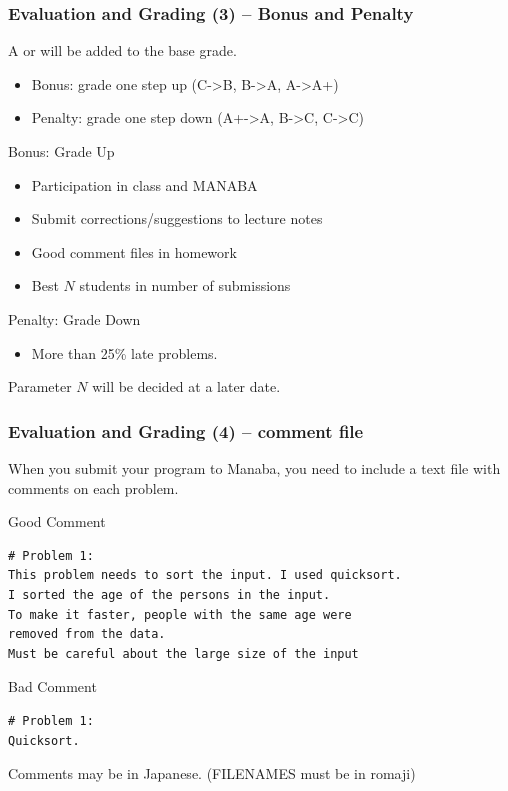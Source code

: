 \documentclass{beamer}
\begin{document}
\begin{frame}
  \frametitle{Evaluation and Grading (3) -- Bonus and Penalty}
  
  {\small
  A  or  will be added to the base grade.
  \begin{itemize}
    \item Bonus: grade one step up (C->B, B->A, A->A+)
    \item Penalty: grade one step down (A+->A, B->C, \alert{C->C})
  \end{itemize}
  }

  \medskip
  \begin{exampleblock}{Bonus: Grade Up}
    \begin{itemize}
    \item Participation in class and MANABA
    \item Submit corrections/suggestions to lecture notes
    \item Good comment files in homework
    \item Best $N$ students in number of submissions
    \end{itemize}
  \end{exampleblock}
  \begin{alertblock}{Penalty: Grade Down}
    \begin{itemize}
    \item More than 25\% late problems.
    \end{itemize}
  \end{alertblock}

  \tiny{Parameter $N$ will be decided at a later date.}
\end{frame}

\begin{frame}
  \frametitle{Evaluation and Grading (4) -- comment file}

  When you submit your program to Manaba, you need to include
  a text file with comments on each problem.
  
  \begin{exampleblock}{Good Comment}
    {\smaller
\begin{verbatim}
# Problem 1:
This problem needs to sort the input. I used quicksort.
I sorted the age of the persons in the input.
To make it faster, people with the same age were 
removed from the data.
Must be careful about the large size of the input 
\end{verbatim}}
  \end{exampleblock}
  \begin{alertblock}{Bad Comment}
{\smaller
\begin{verbatim}
# Problem 1:
Quicksort.
\end{verbatim}}
  \end{alertblock}

  Comments may be in Japanese. (FILENAMES must be in romaji)
\end{frame}
\end{document}

